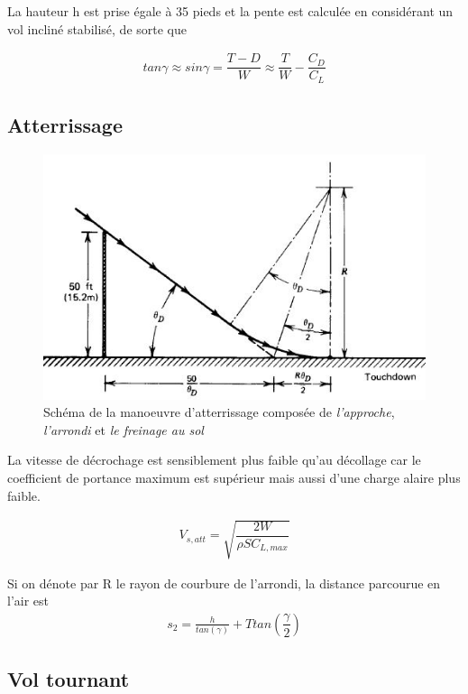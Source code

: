 \documentclass{report}
\begin{document}
La hauteur h est prise égale à 35 pieds et la pente est calculée en considérant un vol incliné stabilisé, de sorte que

\begin{eqnarray}
tan \gamma\approx sin\gamma = \dfrac{T-D}{W}\approx\dfrac{T}{W}-\dfrac{C_D}{C_L}
\end{eqnarray}


\subsection{Atterrissage}

\begin{figure}[h!]
    \centering
    \includegraphics{15.JPG}
    \caption{Schéma de la manoeuvre d'atterrissage composée de \textit{l'approche}, \textit{l'arrondi} et \textit{le freinage au sol}}
    \label{15}
\end{figure}

La vitesse de décrochage est sensiblement plus faible qu'au décollage car le coefficient de portance maximum est supérieur mais aussi d'une charge alaire plus faible.

\begin{eqnarray}
V_{s,att} = \sqrt{\dfrac{2W}{\rho SC_{L,max}}}
\end{eqnarray}

Si on dénote par R le rayon de courbure de l'arrondi, la distance parcourue en l'air est
\begin{eqnarray}
s_2=\frac{h}{tan(\gamma)}+T tan\left(\dfrac{\gamma}{2}\right)
\end{eqnarray}

\subsection{Vol tournant}
\end{document}
